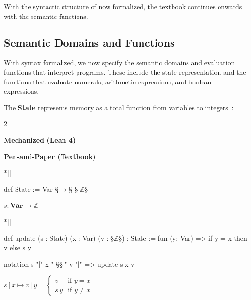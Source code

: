 With the syntactic structure of \While now formalized,
the textbook continues onwards with the semantic functions.

\subsection*{Semantic Domains and Functions}

With syntax formalized, we now specify the semantic domains and evaluation functions that interpret programs.
These include the state representation and the functions that evaluate numerals, arithmetic expressions,
and boolean expressions.

The \textbf{State} represents memory as a total function from variables to integers~\citep[p.~13]{nielson_semantics_2007}:
\begin{paracol}{2}
\begin{leftcolumn}
    \centering \textbf{Mechanized (Lean 4)}
\end{leftcolumn}
\begin{rightcolumn}
    \centering \textbf{Pen-and-Paper (Textbook)} \\\noindent
\end{rightcolumn}

\switchcolumn[1]*[]
\begin{leftcolumn}
    \begin{Lean_Code}
def State := Var §\(\to\)§ § \(\mathbb{Z}\)§
    \end{Lean_Code}
\end{leftcolumn}
\begin{rightcolumn}
\(\displaystyle
s : \mathbf{Var} \to \mathbb{Z}
\)
\end{rightcolumn}

\switchcolumn[1]*[]
\begin{leftcolumn}
    \begin{Lean_Code}
def update (s : State)
  (x : Var) (v : §\(\mathbb{Z}\)§) : State
    :=
  fun (y: Var) => 
    if y = x then v else s y

notation
  s "[" x " §\color{purple}\mapsto§ " v "]" => 
  update s x v
    \end{Lean_Code}
\end{leftcolumn}
\begin{rightcolumn}
    \(\displaystyle
    s[x \mapsto v]y = \begin{cases} 
    v & \text{if } y = x \\ 
    s\,y & \text{if } y \neq x 
    \end{cases}
    \)
\end{rightcolumn}


\end{paracol}
